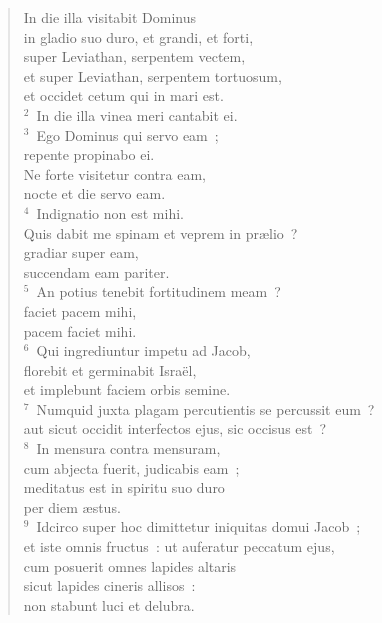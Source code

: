 \begin{flushleft}\begin{verse}\vspace{-19pt}\hspace{6pt}In die illa visitabit Dominus\\\hspace{6pt} in gladio suo duro, et grandi, et forti,\\ super Leviathan, serpentem vectem,\\ et super Leviathan, serpentem tortuosum,\\ et occidet cetum qui in mari est.\\
${}^{2}$~In die illa vinea meri cantabit ei.\\
${}^{3}$~Ego Dominus qui servo eam~;\\ repente propinabo ei.\\ Ne forte visitetur contra eam,\\ nocte et die servo eam.\\
${}^{4}$~Indignatio non est mihi.\\ Quis dabit me spinam et veprem in pr\ae lio~?\\ gradiar super eam,\\ succendam eam pariter.\\
${}^{5}$~An potius tenebit fortitudinem meam~?\\ faciet pacem mihi,\\ pacem faciet mihi.\\
${}^{6}$~Qui ingrediuntur impetu ad Jacob,\\ florebit et germinabit Isra\"el,\\ et implebunt faciem orbis semine.\\
${}^{7}$~Numquid juxta plagam percutientis se percussit eum~?\\ aut sicut occidit interfectos ejus, sic occisus est~?\\
${}^{8}$~In mensura contra mensuram,\\ cum abjecta fuerit, judicabis eam~;\\ meditatus est in spiritu suo duro\\ per diem \ae stus.\\
${}^{9}$~Idcirco super hoc dimittetur iniquitas domui Jacob~;\\ et iste omnis fructus~: ut auferatur peccatum ejus,\\ cum posuerit omnes lapides altaris\\ sicut lapides cineris allisos~:\\ non stabunt luci et delubra.\\

\end{verse}
\end{flushleft}
